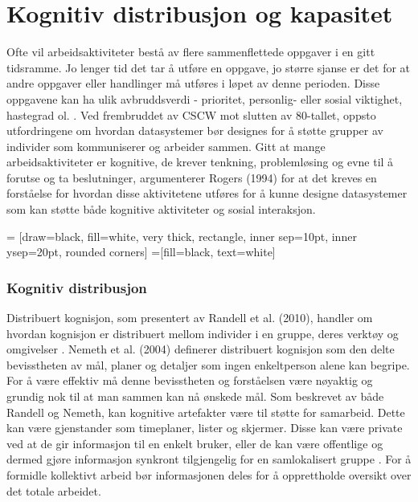 \section{Kognitiv distribusjon og kapasitet}
\label{chp: kognisjon}
Ofte vil arbeidsaktiviteter bestå av flere sammenflettede oppgaver i en gitt tidsramme. Jo lenger tid det tar å utføre en oppgave, jo større sjanse er det for at andre oppgaver eller handlinger må utføres i løpet av denne perioden. Disse oppgavene kan ha ulik avbruddsverdi - prioritet, personlig- eller sosial viktighet, hastegrad ol. \cite{Rogers94}. 
Ved frembruddet av CSCW mot slutten av 80-tallet, oppsto utfordringene om hvordan datasystemer bør designes for å støtte grupper av individer som kommuniserer og arbeider sammen. Gitt at mange arbeidsaktiviteter er kognitive, de krever tenkning, problemløsing og evne til å forutse og ta beslutninger, argumenterer Rogers (1994) for at det kreves en forståelse for hvordan disse aktivitetene utføres for å kunne designe datasystemer som kan støtte både kognitive aktiviteter og sosial interaksjon.


 = [draw=black, fill=white, very thick,
    rectangle, inner sep=10pt, inner ysep=20pt, rounded corners]
 =[fill=black, text=white]
%

\subsubsection{Kognitiv distribusjon}
Distribuert kognisjon, som presentert av Randell et al. (2010), handler om hvordan kognisjon er distribuert mellom individer i en gruppe, deres verktøy og omgivelser \cite{Randell}. Nemeth et al. (2004) definerer distribuert kognisjon som den delte bevisstheten av mål, planer og detaljer som ingen enkeltperson alene kan begripe. For å være effektiv må denne bevisstheten og forståelsen være nøyaktig og grundig nok til at man sammen kan nå ønskede mål. Som beskrevet av både Randell og Nemeth, kan kognitive artefakter være til støtte for samarbeid. Dette kan være gjenstander som timeplaner, lister og skjermer. Disse kan være private ved at de gir informasjon til en enkelt bruker, eller de kan være offentlige og dermed gjøre informasjon synkront tilgjengelig for en samlokalisert gruppe \cite{Randell, Nemeth04}. For å formidle kollektivt arbeid bør informasjonen deles for å opprettholde oversikt over det totale arbeidet.

